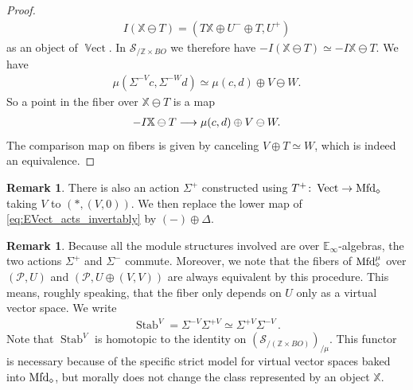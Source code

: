 \documentclass[10pt]{amsart}
\numberwithin{equation}{section}
\theoremstyle{definition}
\newtheorem{rem}[prop]{Remark}
\DeclareMathOperator{\Stab}{Stab}
\DeclareMathOperator{\Vect}{Vect}
\DeclareMathOperator{\bVect}{\mathbb{V}ect}
\newcommand{\Mfd}{\mathrm{Mfd}\vphantom{d}}
\newcommand{\bE}{\mathbb{E}}
\newcommand{\bZ}{\mathbb{Z}}
\newcommand{\bX}{\mathbb{X}}
\newcommand{\cP}{\mathcal{P}}
\newcommand{\cS}{\mathcal{S}}
\renewcommand{\to}{\mathchoice{\longrightarrow}{\rightarrow}{}{}}
\begin{document}
\begin{proof}
	\begin{align*}
		I(\bX \ominus T) = (T\bX \oplus U^{-} \oplus T, U^{+})
	\end{align*}
	as an object of $\bVect$. In $\cS_{/ \bZ\times BO}$ we therefore have $-I(\bX \ominus T) \simeq -I\bX \ominus T$. We have
	\begin{align*}
		\mu(\Sigma^{-V}c,\Sigma^{-W}d) \simeq \mu(c,d) \oplus V \ominus W.
	\end{align*}
	So a point in the fiber over $\bX \ominus T$ is a map
	\begin{align*}
		-I\bX \ominus T \to \mu(c,d) \oplus V \ominus W.
	\end{align*}
	The comparison map on fibers is given by canceling $V\oplus T \simeq W$, which is indeed an equivalence.
\end{proof}
\begin{rem}
	There is also an action $\Sigma^{+}$ constructed using $T^{+}\colon \Vect \to \Mfd_{\diamond}$ taking $V$ to $(\ast, (V,0))$.
  We then replace the lower map of \eqref{eq:EVect_acts_invertably} by $(-)\oplus \Delta$.
\end{rem}
\begin{rem}
	Because all the module structures involved are over $\bE_{\infty}$-algebras, the two actions $\Sigma^{+}$ and $\Sigma^{-}$ commute.
  Moreover, we note that the fibers of $\Mfd_{\diamond}^{\mu}$ over $(\cP,U)$ and $(\cP,U\oplus (V,V))$ are always equivalent by this procedure.
  This means, roughly speaking, that the fiber only depends on $U$ only as a virtual vector space.
  We write
	\begin{align*}
		\Stab^{V} = \Sigma^{-V}\Sigma^{+V}\simeq \Sigma^{+V}\Sigma^{-V} \,.
	\end{align*}
	Note that $\Stab^{V}$ is homotopic to the identity on $(\cS_{/ (\bZ\times BO)})_{/\mu}$.
  This functor is necessary because of the specific strict model for virtual vector spaces baked into $\Mfd_{\diamond}$, but morally does not change the class represented by an object $\bX$.
\end{rem}
\end{document}
